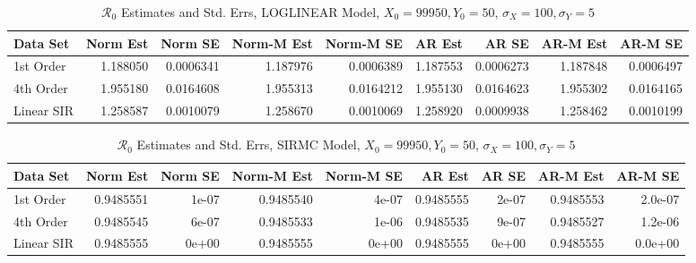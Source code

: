 \documentclass[12pt]{article}
\newcommand{\rr}{\ensuremath{\mathcal{R}_0}}
\begin{document}
\begin{table}[H]
	
	\caption{\label{tab:}$\rr$ Estimates and Std. Errs, LOGLINEAR Model,
		$X_0 = 99950, Y_0 = 50$, $\sigma_X = 100, \sigma_Y = 5$}
	\centering
	\begin{footnotesize}
	\begin{tabular}[t]{l|r|r|r|r|r|r|r|r}
		\hline
		Data Set & Norm Est & Norm SE & Norm-M Est & Norm-M SE & AR Est & AR SE & AR-M Est & AR-M SE\\
		\hline
		1st Order & 1.188050 & 0.0006341 & 1.187976 & 0.0006389 & 1.187553 & 0.0006273 & 1.187848 & 0.0006497\\
		\hline
		4th Order & 1.955180 & 0.0164608 & 1.955313 & 0.0164212 & 1.955130 & 0.0164623 & 1.955302 & 0.0164165\\
		\hline
		Linear SIR & 1.258587 & 0.0010079 & 1.258670 & 0.0010069 & 1.258920 & 0.0009938 & 1.258462 & 0.0010199\\
		\hline
	\end{tabular}
\end{footnotesize}
\end{table}
\begin{table}[H]
	
	\caption{\label{tab:}$\rr$ Estimates and Std. Errs, SIRMC Model,
		$X_0 = 99950, Y_0 = 50$, $\sigma_X = 100, \sigma_Y = 5$}
	\centering
	\begin{footnotesize}
	\begin{tabular}[t]{l|r|r|r|r|r|r|r|r}
		\hline
		Data Set & Norm Est & Norm SE & Norm-M Est & Norm-M SE & AR Est & AR SE & AR-M Est & AR-M SE\\
		\hline
		1st Order & 0.9485551 & 1e-07 & 0.9485540 & 4e-07 & 0.9485555 & 2e-07 & 0.9485553 & 2.0e-07\\
		\hline
		4th Order & 0.9485545 & 6e-07 & 0.9485533 & 1e-06 & 0.9485535 & 9e-07 & 0.9485527 & 1.2e-06\\
		\hline
		Linear SIR & 0.9485555 & 0e+00 & 0.9485555 & 0e+00 & 0.9485555 & 0e+00 & 0.9485555 & 0.0e+00\\
		\hline
	\end{tabular}
\end{footnotesize}
\end{table}
\end{document}
